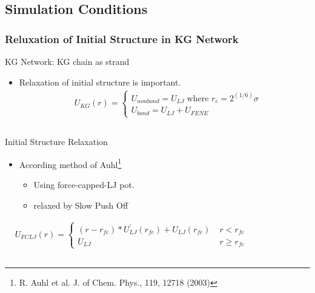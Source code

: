 \documentclass[12pt, dvipdfmx]{beamer}
\begin{document}
\subsection{Simulation Conditions}
\begin{frame}
    \frametitle{Reluxation of Initial Structure in KG Network}
        \vspace{-2mm}
		\begin{block}{KG Network: KG chain as strand}
			\begin{itemize}
				\item \alert{Relaxation of initial structure} is important.
					\fontsize{6pt}{0pt}
					\begin{align*}
						&U_{KG}(r) = 
						\begin{cases}
						U_{nonbond} = U_{LJ} \;\text{where } r_c = 2^{(1/6)}\sigma \\
						U_{bond} = U_{LJ} + U_{FENE}
						\end{cases} 
					\end{align*}
			\end{itemize}
		\end{block}
		\vspace{-3mm}
		\begin{columns}[T, onlytextwidth]
				\begin{exampleblock}{Initial Structure Relaxation}
					\begin{itemize}
						\item According method of Auhl\footnote{
							\scriptsize{R. Auhl et al. J. of Chem. Phys., 119, 12718 (2003)}
						}
						\begin{itemize}
							\item Using force-capped-LJ pot.
							\item relaxed by Slow Push Off
						\end{itemize}
					\end{itemize}
					\fontsize{6pt}{0pt}
					\begin{align*}
						&U_{FCLJ}(r) = 
						\begin{cases}
						(r-r_{fc})*U_{LJ}^{\prime}(r_{fc}) + U_{LJ}(r_{fc}) \; &r< r_{fc} \\
						U_{LJ}   \;\;\;\;\;\;\; &r \geq r_{fc}
						\end{cases} 
					\end{align*}
				\end{exampleblock}
				\vspace{2mm}
				\begin{center}

\end{center}
\end{columns}
\end{frame}
\end{document}
